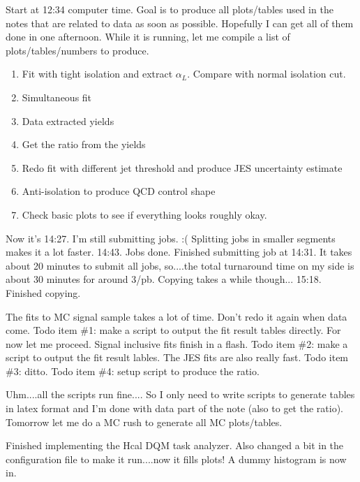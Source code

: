 
Start at 12:34 computer time.  Goal is to produce all plots/tables used in the notes that are related to data as soon as possible.
Hopefully I can get all of them done in one afternoon.  While it is running, let me compile a list of plots/tables/numbers to produce.

\begin{enumerate}
\item Fit with tight isolation and extract $\alpha_L$.  Compare with normal isolation cut.
\item Simultaneous fit
\item Data extracted yields
\item Get the ratio from the yields
\item Redo fit with different jet threshold and produce JES uncertainty estimate
\item Anti-isolation to produce QCD control shape
\item Check basic plots to see if everything looks roughly okay.
\end{enumerate}

Now it's 14:27.  I'm still submitting jobs.  :(
Splitting jobs in smaller segments makes it a lot faster.
14:43.  Jobs done.  Finished submitting job at 14:31.
It takes about 20 minutes to submit all jobs, so....the total turnaround time on my side is about 30 minutes for around 3/pb.
Copying takes a while though...  15:18.  Finished copying.

The fits to MC signal sample takes a lot of time.  Don't redo it again when data come.
Todo item \#1: make a script to output the fit result tables directly.  For now let me proceed.
Signal inclusive fits finish in a flash.  Todo item \#2: make a script to output the fit result lables.
The JES fits are also really fast.  Todo item \#3: ditto.
Todo item \#4: setup script to produce the ratio.

Uhm....all the scripts run fine....
So I only need to write scripts to generate tables in latex format and I'm done with data part of the note (also to get the ratio).
Tomorrow let me do a MC rush to generate all MC plots/tables.



Finished implementing the Hcal DQM task analyzer.  Also changed a bit in the configuration file to make it run....now it fills plots!
A dummy histogram is now in.



